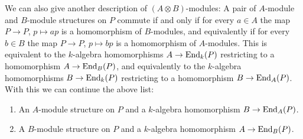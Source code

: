 \begin{fluff}
  We can also give another description of $(A \otimes B)$-modules:
  A pair of $A$-module and $B$-module structures on $P$ commute if and only if for every $a \in A$ the map $P \to P$, $p \mapsto ap$ is a homomorphism of $B$-modules, and equivalently if for every $b \in B$ the map $P \to P$, $p \mapsto bp$ is a homomorphism of $A$-modules.
  This is equivalent to the $k$-algebra homomorphisms $A \to \operatorname{End}_k(P)$ restricting to a homomorphism $A \to \operatorname{End}_B(P)$, and equivalently to the $k$-algebra homomorphisms $B \to \operatorname{End}_k(P)$ restricting to a homomorphism $B \to \operatorname{End}_A(P)$.
  With this we can continue the above list:
  \begin{enumerate}[resume]
    \item
      An $A$-module structure on $P$ and a $k$-algebra homomorphism $B \to \operatorname{End}_A(P)$.
    \item
      A $B$-module structure on $P$ and a $k$-algebra homomorphism $A \to \operatorname{End}_B(P)$.
  \end{enumerate}
\end{fluff}




